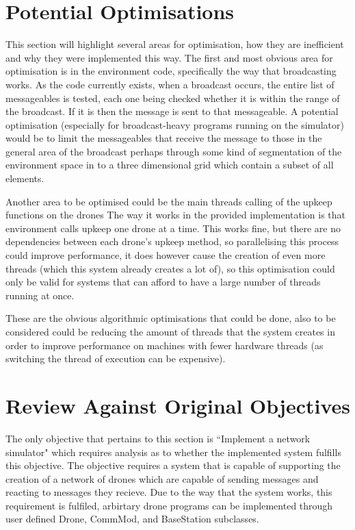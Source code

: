 \section{Potential Optimisations}
	This section will highlight several areas for optimisation, how they are inefficient and why they were implemented this way.
	The first and most obvious area for optimisation is in the environment code, specifically the way that broadcasting works. As the
	code currently exists, when a broadcast occurs, the entire list of messageables is tested, each one being checked whether it is
	within the range of the broadcast. If it is then the message is sent to that messageable. A potential optimisation 
	(especially for broadcast-heavy programs running on the simulator) would be to limit the messageables that receive the
	message to those in the general area of the broadcast perhaps through some kind of segmentation of the environment space in to
	a three dimensional grid which contain a subset of all elements.

	Another area to be optimised could be the main threads calling of the upkeep functions on the drones The way it works
	in the provided implementation is that environment calls upkeep one drone at a time. This works fine, but there are no dependencies
	between each drone's upkeep method, so parallelising this process could improve performance, it does however cause the 
	creation of even more threads (which this system already creates a lot of), so this optimisation could only be valid for
	systems that can afford to have a large number of threads running at once.

	These are the obvious algorithmic optimisations that could be done, also to be considered could be reducing the amount of threads
	that the system creates in order to improve performance on machines with fewer hardware threads (as switching the thread
	of execution can be expensive).

\section{Review Against Original Objectives}
	The only objective that pertains to this section is ``Implement a network simulator" which requires analysis as to whether
	the implemented system fulfills this objective. The objective requires a system that is capable of supporting the creation 
	of a network of drones which are capable of sending messages and reacting to messages they recieve. Due to the way that the
	system works, this requirement is fulfiled, arbirtary drone programs can be implemented through user defined Drone, CommMod, and
	BaseStation subclasses.

